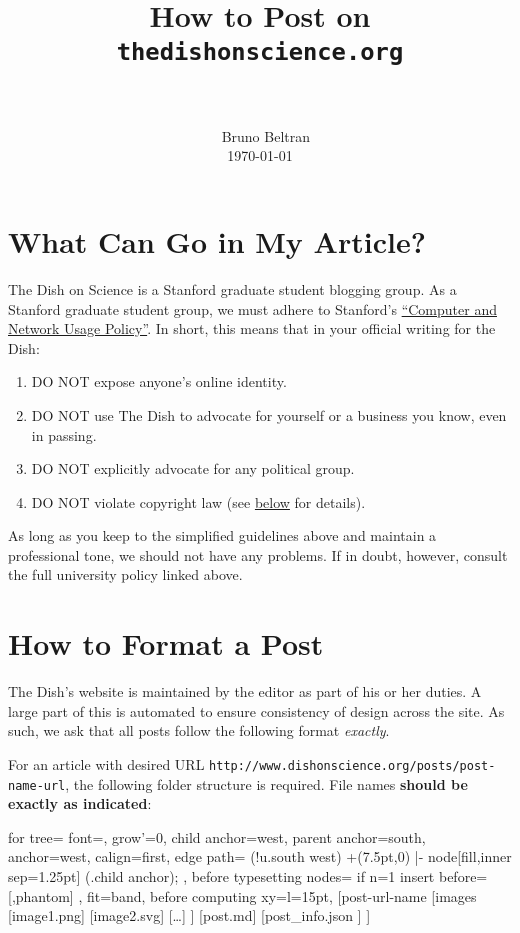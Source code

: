 \documentclass[paper=a4, fontsize=11pt]{scrartcl}
\title{\
        \usefont{OT1}{bch}{b}{n}
        \horrule{0.5pt} \\[0.4cm]
        \huge How to Post on \\ \texttt{thedishonscience.org} \\
        \horrule{2pt} \\[0.5cm]
}
\author{\
        \normalfont{}                     \normalsize
        Bruno Beltran\\[-3pt]             \normalsize
        \today
}
\date{}
\numberwithin{equation}{section}        %
\numberwithin{figure}{section}            %
\numberwithin{table}{section}                %
\begin{document}
\maketitle
\section{What Can Go in My Article?}
The Dish on Science is a Stanford graduate student blogging group.
As a Stanford graduate student group, we must adhere to Stanford's
\href{https://adminguide.stanford.edu/chapter-6/subchapter-2/policy-6-2-1}{``Computer
and Network Usage Policy''}. In short, this means that in your official writing
for the Dish:\@
\begin{enumerate}
    \item DO NOT expose anyone's online identity.
    \item DO NOT use The Dish to advocate for yourself or a business you know,
        even in passing.
    \item DO NOT explicitly advocate for any political group.
    \item DO NOT violate copyright law (see
        \hyperref[how-to-not-violate-copyright]{below} for details).
\end{enumerate}

As long as you keep to the simplified guidelines above and maintain a
professional tone, we should not have any problems. If in doubt, however,
consult the full university policy linked above.

\section{How to Format a Post}
The Dish's website is maintained by the editor as part of his or her duties. A
large part of this is automated to ensure consistency of design across the site.
As such, we ask that all posts follow the following format \textit{exactly}.

For an article with desired URL
\texttt{http://www.dishonscience.org/posts/post-name-url}, the following folder structure is required. File names \textbf{should be exactly as indicated}:


\begin{forest}
  for tree={
    font=\ttfamily,
    grow'=0,
    child anchor=west,
    parent anchor=south,
    anchor=west,
    calign=first,
    edge path={
      \noexpand{}
      (!u.south west) +(7.5pt,0) |- node[fill,inner sep=1.25pt] {} (.child anchor);
    },
    before typesetting nodes={
      if n=1
        {insert before={[,phantom]}}
        {}
    },
    fit=band,
    before computing xy={l=15pt},
  }
[post-url-name
  [images
    [image1.png]
    [image2.svg]
    [\ldots{}]
  ]
  [post.md]
  [post\_info.json ]
]
\end{forest}
\end{document}
